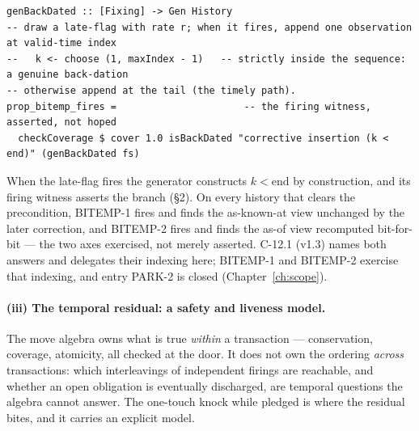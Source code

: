 \documentclass[11pt,a4paper]{article}
\begin{document}
\begin{lstlisting}
genBackDated :: [Fixing] -> Gen History
-- draw a late-flag with rate r; when it fires, append one observation at valid-time index
--   k <- choose (1, maxIndex - 1)   -- strictly inside the sequence: a genuine back-dation
-- otherwise append at the tail (the timely path).
prop_bitemp_fires =                      -- the firing witness, asserted, not hoped
  checkCoverage $ cover 1.0 isBackDated "corrective insertion (k < end)" (genBackDated fs)
\end{lstlisting}

When the late-flag fires the generator constructs $k<\text{end}$ by construction, and its
firing witness asserts the branch (\S 2). On every history that clears the precondition,
BITEMP-1 fires and finds the as-known-at view unchanged by the later correction, and BITEMP-2
fires and finds the as-of view recomputed bit-for-bit --- the two axes exercised, not merely
asserted. C-12.1 (v1.3) names both answers and delegates their indexing here; BITEMP-1 and BITEMP-2
exercise that indexing, and entry PARK-2 is closed (Chapter~\ref{ch:scope}).

\paragraph{(iii) The temporal residual: a safety and liveness model.}
The move algebra owns what is true \emph{within} a transaction --- conservation, coverage,
atomicity, all checked at the door. It does not own the ordering \emph{across} transactions:
which interleavings of independent firings are reachable, and whether an open obligation is
eventually discharged, are temporal questions the algebra cannot answer. The one-touch knock
while pledged is where the residual bites, and it carries an explicit model.
\end{document}

